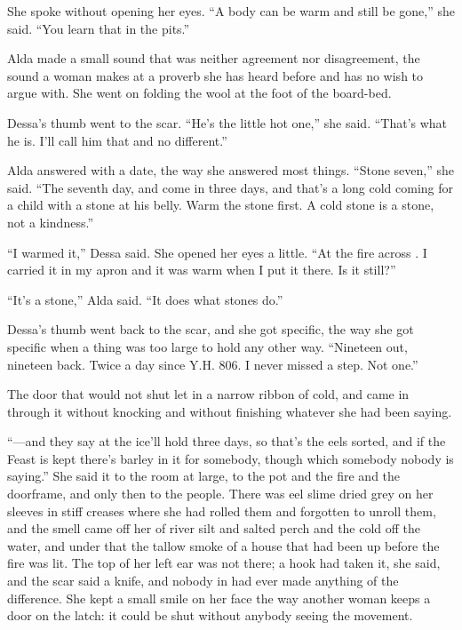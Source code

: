 She spoke without opening her eyes. “A body can be warm and still be gone,” she said. “You learn that in the pits.”

Alda made a small sound that was neither agreement nor disagreement, the sound a woman makes at a proverb she has heard before and has no wish to argue with. She went on folding the wool at the foot of the board-bed.

Dessa's thumb went to the scar. “He's the little hot one,” she said. “That's what he is. I'll call him that and no different.”

Alda answered with a date, the way she answered most things. “Stone seven,” she said. “The seventh day, and  come in three days, and that's a long cold coming for a child with a stone at his belly. Warm the stone first. A cold stone is a stone, not a kindness.”

“I warmed it,” Dessa said. She opened her eyes a little. “At the fire across . I carried it in my apron and it was warm when I put it there. Is it still?”

“It's a stone,” Alda said. “It does what stones do.”

Dessa's thumb went back to the scar, and she got specific, the way she got specific when a thing was too large to hold any other way. “Nineteen out, nineteen back. Twice a day since Y.H. 806. I never missed a step. Not one.”

The door that would not shut let in a narrow ribbon of cold, and  came in through it without knocking and without finishing whatever she had been saying.

“—and they say at  the ice'll hold three days, so that's the eels sorted, and if the Feast is kept there's barley in it for somebody, though which somebody nobody is saying.” She said it to the room at large, to the pot and the fire and the doorframe, and only then to the people. There was eel slime dried grey on her sleeves in stiff creases where she had rolled them and forgotten to unroll them, and the smell came off her of river silt and salted perch and the cold off the water, and under that the tallow smoke of a house that had been up before the fire was lit. The top of her left ear was not there; a hook had taken it, she said, and the scar said a knife, and nobody in  had ever made anything of the difference. She kept a small smile on her face the way another woman keeps a door on the latch: it could be shut without anybody seeing the movement.


